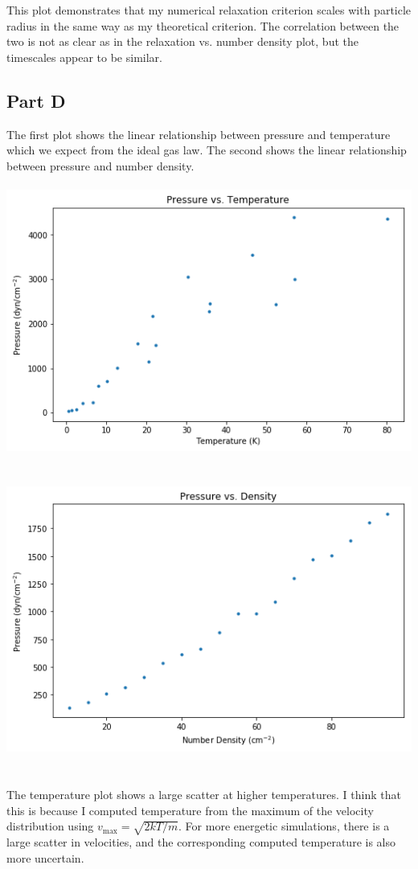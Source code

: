 \documentclass[a4paper, 11pt]{article}
\begin{document}
		\ \\ \\
		This plot demonstrates that my numerical relaxation criterion scales with particle radius in the same way as my 
		theoretical criterion. The correlation between the two is not as clear as in the relaxation vs. number density plot, 
		but the timescales appear to be similar. 
	\subsection*{Part D}
		The first plot shows the linear relationship between pressure and temperature which we expect from the ideal 
		gas law. The second shows the linear relationship between pressure and number density. 
		\ \\ \\
		\includegraphics[width=15cm]{pressure_v_temp.png}
		\ \\ \\
		\includegraphics[width=15cm]{pressure_v_dens.png}
		\ \\ \\
		The temperature plot shows a large scatter at higher temperatures. I think that this is because I computed 
		temperature from the maximum of the velocity distribution using $v_\text{max} = \sqrt{2kT/m}$. For more energetic 
		simulations, there is a large scatter in velocities, and the corresponding computed temperature is also more 
		uncertain. 
\end{document}

